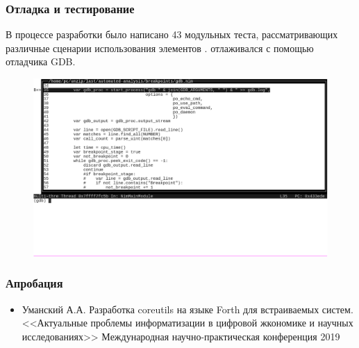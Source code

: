 \begin{frame}%
\frametitle{Отладка и тестирование {\ProgModule}}
    В процессе разработки {\ProgModule} было написано 43 модульных теста, рассматривающих
    различные сценарии использования элементов {\ProgModule}. {\ProgModule} отлаживался
    с помощью отладчика GDB.
    
    \vspace{3ex}
    \begin{figure}[!htbp]
        \begin{adjustbox}{max totalsize={1.2\textwidth}{1.2\textheight}}
            \includegraphics[trim={0 4ex 0 0 0},clip,width=\linewidth]{images/running-gdb.png}
        \end{adjustbox}
    \end{figure}

\end{frame}

\begin{frame}%
\frametitle{Апробация}
    \begin{itemize}
        \item Уманский А.А. Разработка coreutils на языке Forth для встраиваемых систем.
            <<Актуальные проблемы информатизации в цифровой жкономике и научных исследованиях>>
            Международная научно-практическая конференция 2019
    \end{itemize}
\end{frame}

